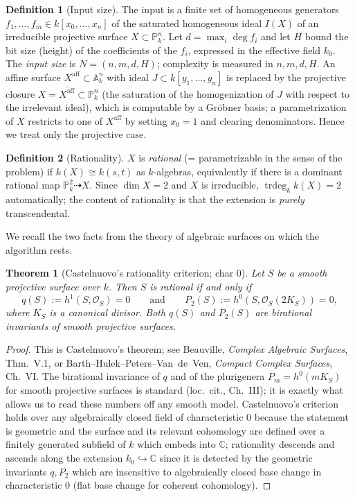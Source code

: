 \documentclass{amsart}
\theoremstyle{plain}
\newtheorem{theorem}{Theorem}
\theoremstyle{definition}
\newtheorem{definition}{Definition}
\newcommand{\PP}{\mathbb{P}}
\newcommand{\AA}{\mathbb{A}}
\newcommand{\cO}{\mathcal{O}}
\DeclareMathOperator{\trdeg}{trdeg}
\begin{document}
\begin{definition}[Input size]\label{def:size}
The input is a finite set of homogeneous generators $f_1,\dots,f_m\in
k[x_0,\dots,x_n]$ of the saturated homogeneous ideal $I(X)$ of an irreducible
projective surface $X\subset\PP^n_k$.  Let $d=\max_i\deg f_i$ and let $H$ bound
the bit size (height) of the coefficients of the $f_i$, expressed in the
effective field $k_0$.  The \emph{input size} is $N=(n,m,d,H)$; complexity is
measured in $n,m,d,H$.  An affine surface $X^{\mathrm{aff}}\subset\AA^n_k$ with
ideal $J\subset k[y_1,\dots,y_n]$ is replaced by the projective closure
$X=\overline{X^{\mathrm{aff}}}\subset\PP^n_k$ (the saturation of the
homogenization of $J$ with respect to the irrelevant ideal), which is computable
by a Gr\"obner basis; a parametrization of $X$ restricts to one of
$X^{\mathrm{aff}}$ by setting $x_0=1$ and clearing denominators.  Hence we treat
only the projective case.
\end{definition}

\begin{definition}[Rationality]\label{def:rat}
$X$ is \emph{rational} (= parametrizable in the sense of the problem) if
$k(X)\cong k(s,t)$ as $k$-algebras, equivalently if there is a dominant rational
map $\PP^2_k\dashrightarrow X$.  Since $\dim X=2$ and $X$ is irreducible,
$\trdeg_k k(X)=2$ automatically; the content of rationality is that the
extension is \emph{purely} transcendental.
\end{definition}

We recall the two facts from the theory of algebraic surfaces on which the
algorithm rests.

\begin{theorem}[Castelnuovo's rationality criterion; char $0$]
\label{thm:castelnuovo}
Let $S$ be a smooth projective surface over $k$.  Then $S$ is rational if and
only if
\[
q(S):=h^1(S,\cO_S)=0
\qquad\text{and}\qquad
P_2(S):=h^0(S,\cO_S(2K_S))=0 ,
\]
where $K_S$ is a canonical divisor.  Both $q(S)$ and $P_2(S)$ are birational
invariants of smooth projective surfaces.
\end{theorem}

\begin{proof}
This is Castelnuovo's theorem; see Beauville, \emph{Complex Algebraic
Surfaces}, Thm.~V.1, or Barth--Hulek--Peters--Van~de~Ven, \emph{Compact Complex
Surfaces}, Ch.~VI.  The birational invariance of $q$ and of the plurigenera
$P_m=h^0(mK_S)$ for smooth projective surfaces is standard (loc.\ cit.,
Ch.~III); it is exactly what allows us to read these numbers off any smooth
model.  Castelnuovo's criterion holds over any algebraically closed field of
characteristic $0$ because the statement is geometric and the surface and its
relevant cohomology are defined over a finitely generated subfield of $k$ which
embeds into $\mathbb{C}$; rationality descends and ascends along the extension
$k_0\hookrightarrow\mathbb{C}$ since it is detected by the geometric invariants
$q,P_2$ which are insensitive to algebraically closed base change in
characteristic $0$ (flat base change for coherent cohomology).
\end{proof}
\end{document}
